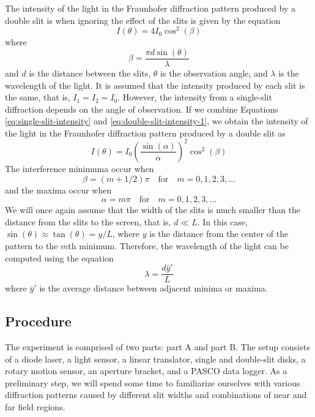 \documentclass[10pt]{article}
\begin{document}
The intensity of the light in the Fraunhofer diffraction pattern produced by a double slit is when ignoring the effect of the slits is given by the equation
\begin{equation}
  I(\theta) = 4 I_0 \cos^2(\beta)
  \label{eq:double-slit-intensity-1}
\end{equation}
where
\begin{equation}
  \beta = \frac{\pi d \sin(\theta)}{\lambda}
\end{equation}
and $d$ is the distance between the slits, $\theta$ is the observation angle, and $\lambda$ is the wavelength of the light. It is assumed that the intensity produced by each slit is the same, that is, $I_1 = I_2 = I_0$. However, the intensity from a single-slit diffraction depends on the angle of observation. If we combine Equations \eqref{eq:single-slit-intensity} and \eqref{eq:double-slit-intensity-1}, we obtain the intensity of the light in the Fraunhofer diffraction pattern produced by a double slit as
\begin{equation}
  I(\theta) = I_0 \left( \frac{\sin(\alpha)}{\alpha} \right)^2 \cos^2(\beta)
  \label{eq:double-slit-intensity-2}
\end{equation}
The interference minimuma occur when
\begin{equation}
  \beta = (m + 1/2) \pi \quad \text{for} \quad m = 0, 1, 2, 3, \ldots
\end{equation}
and the maxima occur when
\begin{equation}
  \alpha = m \pi \quad \text{for} \quad m = 0, 1, 2, 3, \ldots
\end{equation}  
We will once again assume that the width of the slits is much smaller than the distance from the slits to the screen, that is, $d \ll L$. In this case, $\sin(\theta) \approx \tan(\theta) = y/L$, where $y$ is the distance from the center of the pattern to the $m$th minimum. Therefore, the wavelength of the light can be computed using the equation
\begin{equation}
  \lambda = \frac{d \bar{y}'}{L}
\end{equation}
where $\bar{y}'$ is the average distance between adjacent minima or maxima.

\subsection*{Procedure} 

The experiment is comprised of two parts: part A and part B. The setup consists of a diode laser, a light sensor, a linear translator, single and double-slit disks, a rotary motion sensor, an aperture bracket, and a PASCO{\textsuperscript\textregistered} data logger. As a preliminary step, we will spend some time to familiarize ourselves with various diffraction patterns caused by different slit widths and combinations of near and far field regions.
\end{document}
